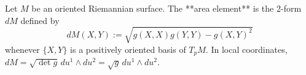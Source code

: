 Let $M$ be an oriented Riemannian surface. The **area element** is the 2-form $dM$ defined by
$$dM(X, Y) := \sqrt{g(X, X) g(Y, Y) - g(X, Y)^2}$$
whenever $\{X, Y\}$ is a positively oriented basis of $T_pM$. In local coordinates, $dM = \sqrt{\det g} \, du^1 \wedge du^2 = \sqrt{g} \, du^1 \wedge du^2$.